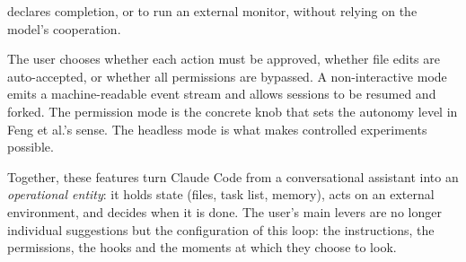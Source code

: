 \begin{description}[leftmargin=0pt]
        declares completion, or to run an external monitor, without relying on the model's
        cooperation.
  \item[Permission modes and headless use.] The user chooses whether each action must be approved,
        whether file edits are auto-accepted, or whether all permissions are bypassed. A non-interactive
        mode emits a machine-readable event stream and allows sessions to be resumed and forked. The
        permission mode is the concrete knob that sets the autonomy level in Feng et al.'s sense. The
        headless mode is what makes controlled experiments possible.
\end{description}

Together, these features turn Claude Code from a conversational assistant into an \emph{operational
entity}: it holds state (files, task list, memory), acts on an external environment, and decides when
it is done. The user's main levers are no longer individual suggestions but the configuration of this
loop: the instructions, the permissions, the hooks and the moments at which they choose to look.
